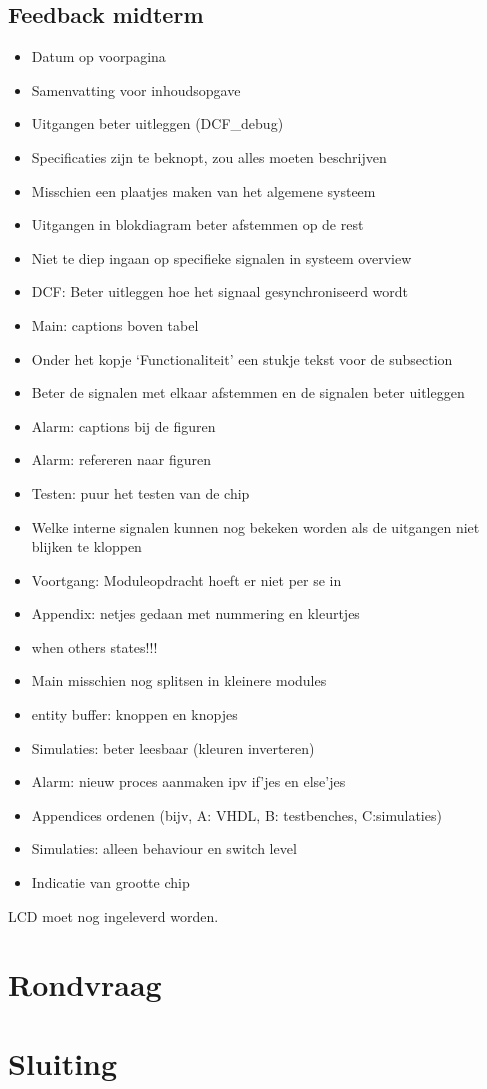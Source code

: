 \documentclass[11pt,twoside,a4paper]{article}
\begin{document}
\subsection{Feedback midterm}
\begin{itemize}
\item Datum op voorpagina
\item Samenvatting voor inhoudsopgave
\item Uitgangen beter uitleggen (DCF\_debug)
\item Specificaties zijn te beknopt, zou alles moeten beschrijven
\item Misschien een plaatjes maken van het algemene systeem
\item Uitgangen in blokdiagram beter afstemmen op de rest
\item Niet te diep ingaan op specifieke signalen in systeem overview
\item DCF: Beter uitleggen hoe het signaal gesynchroniseerd wordt
\item Main: captions boven tabel
\item Onder het kopje `Functionaliteit' een stukje tekst voor de subsection
\item Beter de signalen met elkaar afstemmen en de signalen beter uitleggen
\item Alarm: captions bij de figuren
\item Alarm: refereren naar figuren
\item Testen: puur het testen van de chip
\item Welke interne signalen kunnen nog bekeken worden als de uitgangen niet blijken te kloppen
\item Voortgang: Moduleopdracht hoeft er niet per se in
\item Appendix: netjes gedaan met nummering en kleurtjes
\item when others states!!!
\item Main misschien nog splitsen in kleinere modules
\item entity buffer: knoppen en knopjes
\item Simulaties: beter leesbaar (kleuren inverteren)
\item Alarm: nieuw proces aanmaken ipv if'jes en else'jes
\item Appendices ordenen (bijv, A: VHDL, B: testbenches, C:simulaties)
\item Simulaties: alleen behaviour en switch level
\item Indicatie van grootte chip
\end{itemize}

LCD moet nog ingeleverd worden.
\section{Rondvraag}

\section{Sluiting}
\end{document}
